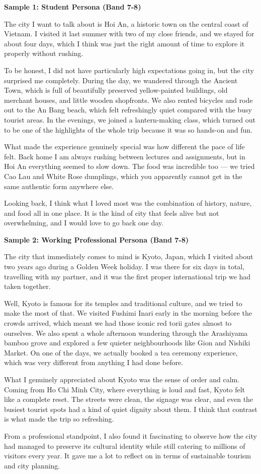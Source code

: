 \begin{ieltsanswer}
\textbf{Sample 1: Student Persona (Band 7-8)}

The city I want to talk about is Hoi An, a historic town on the central coast of Vietnam. I visited it last summer with two of my close friends, and we stayed for about four days, which I think was just the right amount of time to explore it properly without rushing.

To be honest, I did not have particularly high expectations going in, but the city surprised me completely. During the day, we wandered through the Ancient Town, which is full of beautifully preserved yellow-painted buildings, old merchant houses, and little wooden shopfronts. We also rented bicycles and rode out to the An Bang beach, which felt refreshingly quiet compared with the busy tourist areas. In the evenings, we joined a lantern-making class, which turned out to be one of the highlights of the whole trip because it was so hands-on and fun.

What made the experience genuinely special was how different the pace of life felt. Back home I am always rushing between lectures and assignments, but in Hoi An everything seemed to slow down. The food was incredible too — we tried Cao Lau and White Rose dumplings, which you apparently cannot get in the same authentic form anywhere else.

Looking back, I think what I loved most was the combination of history, nature, and food all in one place. It is the kind of city that feels alive but not overwhelming, and I would love to go back one day.

\textbf{Sample 2: Working Professional Persona (Band 7-8)}

The city that immediately comes to mind is Kyoto, Japan, which I visited about two years ago during a Golden Week holiday. I was there for six days in total, travelling with my partner, and it was the first proper international trip we had taken together.

Well, Kyoto is famous for its temples and traditional culture, and we tried to make the most of that. We visited Fushimi Inari early in the morning before the crowds arrived, which meant we had those iconic red torii gates almost to ourselves. We also spent a whole afternoon wandering through the Arashiyama bamboo grove and explored a few quieter neighbourhoods like Gion and Nishiki Market. On one of the days, we actually booked a tea ceremony experience, which was very different from anything I had done before.

What I genuinely appreciated about Kyoto was the sense of order and calm. Coming from Ho Chi Minh City, where everything is loud and fast, Kyoto felt like a complete reset. The streets were clean, the signage was clear, and even the busiest tourist spots had a kind of quiet dignity about them. I think that contrast is what made the trip so refreshing.

From a professional standpoint, I also found it fascinating to observe how the city had managed to preserve its cultural identity while still catering to millions of visitors every year. It gave me a lot to reflect on in terms of sustainable tourism and city planning.
\end{ieltsanswer}

